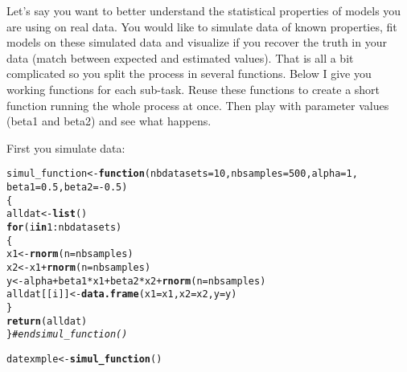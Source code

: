 \documentclass[12pt,a4paper]{scrartcl}\usepackage[]{graphicx}\usepackage[]{color}
\makeatletter
\newcommand{\hlnum}[1]{\textcolor[rgb]{0.686,0.059,0.569}{#1}}%
\newcommand{\hlcom}[1]{\textcolor[rgb]{0.678,0.584,0.686}{\textit{#1}}}%
\newcommand{\hlopt}[1]{\textcolor[rgb]{0,0,0}{#1}}%
\newcommand{\hlstd}[1]{\textcolor[rgb]{0.345,0.345,0.345}{#1}}%
\newcommand{\hlkwa}[1]{\textcolor[rgb]{0.161,0.373,0.58}{\textbf{#1}}}%
\newcommand{\hlkwb}[1]{\textcolor[rgb]{0.69,0.353,0.396}{#1}}%
\newcommand{\hlkwc}[1]{\textcolor[rgb]{0.333,0.667,0.333}{#1}}%
\newcommand{\hlkwd}[1]{\textcolor[rgb]{0.737,0.353,0.396}{\textbf{#1}}}%
\newenvironment{kframe}{%
 \def\at@end@of@kframe{}%
 \ifinner\ifhmode%
  \def\at@end@of@kframe{\end{minipage}}%
  \begin{minipage}{\columnwidth}%
 \fi\fi%
 \def\FrameCommand##1{\hskip\@totalleftmargin \hskip-\fboxsep
 \colorbox{shadecolor}{##1}\hskip-\fboxsep
     \hskip-\linewidth \hskip-\@totalleftmargin \hskip\columnwidth}%
 \MakeFramed {\advance\hsize-\width
   \@totalleftmargin\z@ \linewidth\hsize
   \@setminipage}}%
 {\par\unskip\endMakeFramed%
 \at@end@of@kframe}
\newenvironment{knitrout}{}{} %
\makeatother
\begin{document}
\begin{Exercise}[difficulty=2, title={Combine several functions together}]

Let's say you want to better understand the statistical properties of models you are using on real data. You would like to simulate data of known properties, fit models on these simulated data and visualize if you recover the truth in your data (match between expected and estimated values). That is all a bit complicated so you split the process in several functions. 
Below I give you working functions for each sub-task. Reuse these functions to create a short function running the whole process at once. Then play with parameter values (beta1 and beta2) and see what happens.

First you simulate data:
\begin{knitrout}
\color{fgcolor}\begin{kframe}
\begin{alltt}
\hlstd{simul_function} \hlkwb{<-} \hlkwa{function}\hlstd{(}\hlkwc{nbdatasets} \hlstd{=} \hlnum{10}\hlstd{,} \hlkwc{nbsamples}\hlstd{=} \hlnum{500}\hlstd{,} \hlkwc{alpha}\hlstd{=}\hlnum{1}\hlstd{,}
                           \hlkwc{beta1}\hlstd{=}\hlnum{0.5}\hlstd{,} \hlkwc{beta2}\hlstd{=}\hlopt{-}\hlnum{0.5}\hlstd{)}
\hlstd{\{}
  \hlstd{alldat} \hlkwb{<-} \hlkwd{list}\hlstd{()}
  \hlkwa{for} \hlstd{(i} \hlkwa{in} \hlnum{1}\hlopt{:}\hlstd{nbdatasets)}
  \hlstd{\{}
    \hlstd{x1} \hlkwb{<-} \hlkwd{rnorm}\hlstd{(}\hlkwc{n} \hlstd{= nbsamples)}
    \hlstd{x2} \hlkwb{<-} \hlstd{x1} \hlopt{+} \hlkwd{rnorm}\hlstd{(}\hlkwc{n} \hlstd{= nbsamples)}
    \hlstd{y} \hlkwb{<-} \hlstd{alpha} \hlopt{+} \hlstd{beta1}\hlopt{*}\hlstd{x1} \hlopt{+} \hlstd{beta2}\hlopt{*}\hlstd{x2} \hlopt{+} \hlkwd{rnorm}\hlstd{(}\hlkwc{n} \hlstd{= nbsamples)}
    \hlstd{alldat[[i]]} \hlkwb{<-} \hlkwd{data.frame}\hlstd{(}\hlkwc{x1}\hlstd{=x1,} \hlkwc{x2}\hlstd{=x2,} \hlkwc{y}\hlstd{=y)}
  \hlstd{\}}
  \hlkwd{return}\hlstd{(alldat)}
\hlstd{\}}\hlcom{#end simul_function()}

\hlstd{datexmple} \hlkwb{<-} \hlkwd{simul_function}\hlstd{()}
\end{alltt}
\end{kframe}
\end{knitrout}


\end{Exercise}
\end{document}
